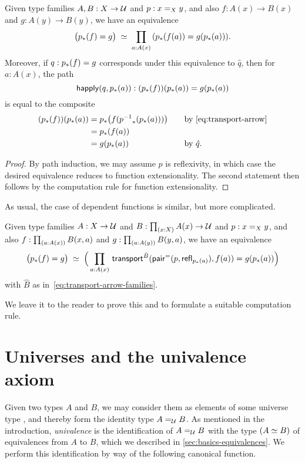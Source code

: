 \begin{lem}\label{thm:dpath-arrow}
  Given type families $A,B:X\to\type$ and $p:\id[X]xy$, and also $f:A(x)\to B(x)$ and $g:A(y)\to B(y)$, we have an equivalence
  \[ \eqvspaced{ \big(\trans{p}{f} = {g}\big) } { \prd{a:A(x)}  (\trans{p}{f(a)} = g(\trans{p}{a})) }. \]
  Moreover, if $q:\trans{p}{f} = {g}$ corresponds under this equivalence to $\hat q$, then for $a:A(x)$, the path
  \[ \happly(q,\trans p a) : (\trans p f)(\trans p a) = g(\trans p a)\]
  is equal to the composite
  \begin{alignat*}{2}
    (\trans p f)(\trans p a)
    &= \trans p {f (\trans {\opp p}{\trans p a})}
    &&\quad\text{by~\eqref{eq:transport-arrow}}\\
    &= \trans p {f(a)}\\
    &= g(\trans p a)
    &&\quad\text{by $\hat{q}$.}
  \end{alignat*}
\end{lem}
\begin{proof}
  By path induction, we may assume $p$ is reflexivity, in which case the desired equivalence reduces to function extensionality.
  The second statement then follows by the computation rule for function extensionality.
\end{proof}

As usual, the case of dependent functions is similar, but more complicated.

\begin{lem}\label{thm:dpath-forall}
  Given type families $A:X\to\type$ and $B:\prd{x:X} A(x)\to\type$ and $p:\id[X]xy$, and also $f:\prd{a:A(x)} B(x,a)$ and $g:\prd{a:A(y)} B(y,a)$, we have an equivalence
  \[ \eqvspaced{ \big(\trans{p}{f} = {g}\big) } { \Big(\prd{a:A(x)}  \transfib{\hat{B}}{\pairpath(p,\refl{\trans pa})}{f(a)} = g(\trans{p}{a}) \Big) } \]
  with $\hat{B}$ as in~\eqref{eq:transport-arrow-families}.
\end{lem}

We leave it to the reader to prove this and to formulate a suitable computation rule.


\section{Universes and the univalence axiom}
\label{sec:compute-universe}

Given two types $A$ and $B$, we may consider them as elements of some universe type \type, and thereby form the identity type $\id[\type]AB$.
As mentioned in the introduction, \emph{univalence} is the identification of $\id[\type]AB$ with the type $(\eqv AB)$ of equivalences from $A$ to $B$, which we described in \autoref{sec:basics-equivalences}.
We perform this identification by way of the following canonical function.

